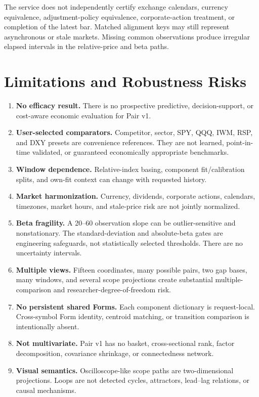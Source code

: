 \documentclass{article}
\begin{document}
The service does not independently certify exchange calendars, currency equivalence, adjustment-policy equivalence, corporate-action treatment, or completion of the latest bar. Matched alignment keys may still represent asynchronous or stale markets. Missing common observations produce irregular elapsed intervals in the relative-price and beta paths.

\section{Limitations and Robustness Risks}

\begin{enumerate}
    \item \textbf{No efficacy result.} There is no prospective predictive, decision-support, or cost-aware economic evaluation for Pair v1.
    \item \textbf{User-selected comparators.} Competitor, sector, SPY, QQQ, IWM, RSP, and DXY presets are convenience references. They are not learned, point-in-time validated, or guaranteed economically appropriate benchmarks.
    \item \textbf{Window dependence.} Relative-index basing, component fit/calibration splits, and own-fit context can change with requested history.
    \item \textbf{Market harmonization.} Currency, dividends, corporate actions, calendars, timezones, market hours, and stale-price risk are not jointly normalized.
    \item \textbf{Beta fragility.} A 20--60 observation slope can be outlier-sensitive and nonstationary. The standard-deviation and absolute-beta gates are engineering safeguards, not statistically selected thresholds. There are no uncertainty intervals.
    \item \textbf{Multiple views.} Fifteen coordinates, many possible pairs, two gap bases, many windows, and several scope projections create substantial multiple-comparison and researcher-degree-of-freedom risk.
    \item \textbf{No persistent shared Forms.} Each component dictionary is request-local. Cross-symbol Form identity, centroid matching, or transition comparison is intentionally absent.
    \item \textbf{Not multivariate.} Pair v1 has no basket, cross-sectional rank, factor decomposition, covariance shrinkage, or connectedness network.
    \item \textbf{Visual semantics.} Oscilloscope-like scope paths are two-dimensional projections. Loops are not detected cycles, attractors, lead--lag relations, or causal mechanisms.

\end{enumerate}
\end{document}
